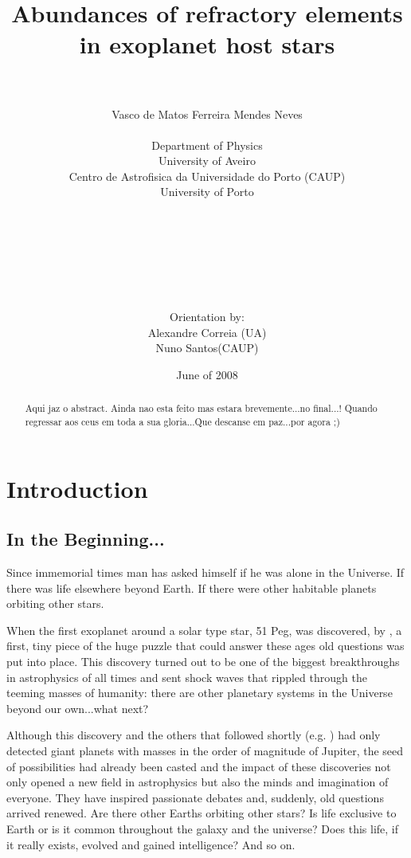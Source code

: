 \documentclass[dvips,12pt,a4paper]{report}
\title{Abundances of refractory elements in exoplanet host stars}
\author{\\
\\
Vasco de Matos Ferreira Mendes Neves \\ [4mm]
\\
Department of Physics \\
University of Aveiro \\
Centro de Astrofisica da Universidade do Porto (CAUP) \\
University of Porto
\\
\\
\\
\\
\\
\\
\\
\\
Orientation by:\\
Alexandre Correia (UA) \\ Nuno Santos(CAUP)}
\date{June of 2008}
\begin{document}
\maketitle
\begin{abstract}
 Aqui jaz o abstract. Ainda nao esta feito mas estara brevemente...no final...! Quando regressar aos ceus em toda a sua gloria...Que descanse em paz...por agora ;)
\end{abstract}
\newpage
\tableofcontents
\newpage



\chapter{Introduction}

\section{In the Beginning...}

Since immemorial times man has asked himself if he was alone in the Universe. If there was life elsewhere beyond Earth. If there were other habitable planets orbiting other stars.

When the first exoplanet around a solar type star, 51 Peg, was discovered, by \citet{Mayor-1995}, %
a first, tiny piece of the huge puzzle that could answer these ages old questions was put into place. This discovery turned out to be one of the biggest breakthroughs in astrophysics of all times and sent shock waves that rippled through the teeming masses of humanity: there are other planetary systems in the Universe beyond our own...what next?

\indent Although this discovery and the others that followed shortly (e.g. \citeauthor{Marcy-1996} \citeyear{Marcy-1996}) had only detected giant planets with masses in the order of magnitude of Jupiter, the seed of possibilities had already been casted and the impact of these discoveries not only  opened a new field in astrophysics but also the minds and imagination of everyone. They have inspired passionate debates and, suddenly, old questions arrived renewed. Are there other Earths orbiting other stars? Is life exclusive to Earth or is it common throughout the galaxy and the universe? Does this life, if it really exists, evolved and gained intelligence? And so on. 
\end{document}
